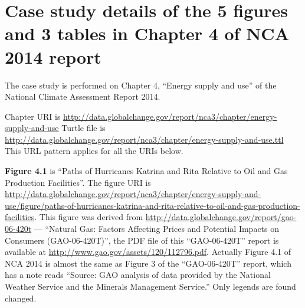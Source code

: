 \chapter{Case study details of the 5 figures and 3 tables in Chapter 4 of NCA 2014 report}
The case study is performed on Chapter 4, ``Energy supply and use'' of the National Climate Assessment Report 2014.

Chapter URI is \url{http://data.globalchange.gov/report/nca3/chapter/energy-supply-and-use}
Turtle file is \url{http://data.globalchange.gov/report/nca3/chapter/energy-supply-and-use.ttl}
This URL pattern applies for all the URIs below.

\textbf{Figure 4.1} is ``Paths of Hurricanes Katrina and Rita Relative to Oil and Gas Production Facilities''. The
figure URI is \url{http://data.globalchange.gov/report/nca3/chapter/energy-supply-and-use/figure/paths-of-hurricanes-katrina-and-rita-relative-to-oil-and-gas-production-facilities}.
This figure was derived from \url{http://data.globalchange.gov/report/gao-06-420t} --- ``Natural Gas: Factors Affecting Prices and Potential Impacts on Consumers (GAO-06-420T)'', the 
PDF file of this ``GAO-06-420T'' report is available at \url{http://www.gao.gov/assets/120/112796.pdf}.
Actually Figure 4.1 of NCA 2014 is almost the same as Figure 3 of the ``GAO-06-420T'' report, which has a note reads ``Source: GAO analysis of data provided by the National Weather Service and the Minerals Management Service.''
Only legends are found changed.

